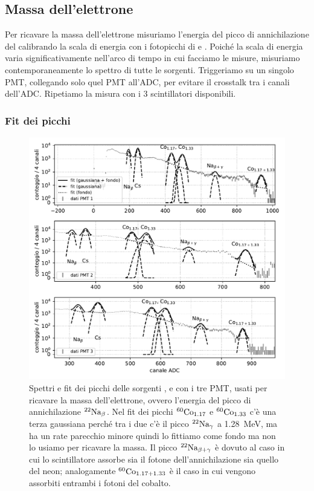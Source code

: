 \subsection{Massa dell'elettrone}

Per ricavare la massa dell'elettrone misuriamo l'energia del picco di annichilazione del \na{}
calibrando la scala di energia con i fotopicchi di \co{} e \cs{}.
Poiché la scala di energia varia significativamente nell'arco di tempo in cui facciamo le misure,
misuriamo contemporaneamente lo spettro di tutte le sorgenti.
Triggeriamo su un singolo PMT,
collegando solo quel PMT all'ADC, per evitare il crosstalk tra i canali dell'ADC.
Ripetiamo la misura con i 3 scintillatori disponibili.

\subsubsection{Fit dei picchi}

\begin{figure}
	\includegraphics[width=\textwidth]{immagini/mass18-peaks}
	\caption{\label{fig:mass18-peaks}
	Spettri e fit dei picchi delle sorgenti \na{}, \cs{} e \co{} con i tre PMT,
	usati per ricavare la massa dell'elettrone,
	ovvero l'energia del picco di annichilazione $^{\text{22}}\text{Na}_\beta$.
	Nel fit dei picchi $^{\text{60}}\text{Co}_{1.17}$ e $^{\text{60}}\text{Co}_{1.33}$ c'è una terza gaussiana
	perché tra i due c'è il picco $^{\text{22}}\text{Na}_\gamma$ a \SI{1.28}{MeV},
	ma ha un rate parecchio minore quindi lo fittiamo come fondo ma non lo usiamo per ricavare la massa.
	Il picco $^{\text{22}}\text{Na}_{\beta+\gamma}$ è dovuto al caso in cui lo scintillatore
	assorbe sia il fotone dell'annichilazione sia quello del neon;
	analogamente $^{\text{60}}\text{Co}_{1.17+1.33}$ è il caso in cui vengono assorbiti entrambi i fotoni del cobalto.}
\end{figure}

